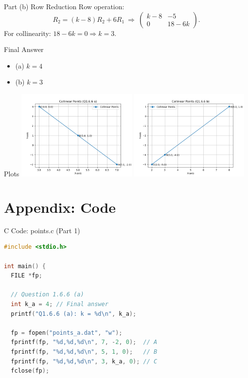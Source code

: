 \documentclass{beamer}
\numberwithin{equation}{section}
\theoremstyle{remark}
\newcommand{\myvec}[1]{\ensuremath{\begin{pmatrix}#1\end{pmatrix}}}
\begin{document}
\begin{frame}{Part (b) Row Reduction}
Row operation:
\[
R_2 = (k-8)R_2 + 6R_1 \ \Rightarrow\
\myvec{k-8 & -5\\ 0 & 18-6k}.
\]
For collinearity: $18-6k=0 \Rightarrow k=\boxed{3}$.
\end{frame}

\begin{frame}{Final Answer}
\begin{itemize}
\item (a) $k=4$
\item (b) $k=3$
\end{itemize}
\end{frame}

\begin{frame}{Plots}
\centering
\includegraphics[width=0.45\textwidth]{figs/fig_a.png}\hfill
\includegraphics[width=0.45\textwidth]{figs/fig_b.png}
\end{frame}

\section*{Appendix: Code}

\begin{frame}[fragile]{C Code: points.c (Part 1)}
\begin{lstlisting}[language=C]
#include <stdio.h>

int main() {
  FILE *fp;

  // Question 1.6.6 (a)
  int k_a = 4; // Final answer
  printf("Q1.6.6 (a): k = %d\n", k_a);

  fp = fopen("points_a.dat", "w");
  fprintf(fp, "%d,%d,%d\n", 7, -2, 0);  // A
  fprintf(fp, "%d,%d,%d\n", 5, 1, 0);   // B
  fprintf(fp, "%d,%d,%d\n", 3, k_a, 0); // C
  fclose(fp);
\end{lstlisting}
\end{frame}
\end{document}
